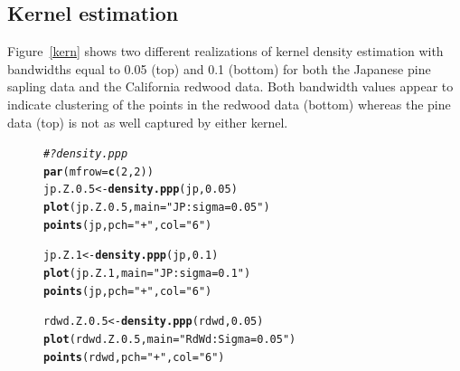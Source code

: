 \documentclass{article}\usepackage[]{graphicx}\usepackage[]{color}
\makeatletter
\newcommand{\hlnum}[1]{\textcolor[rgb]{0.686,0.059,0.569}{#1}}%
\newcommand{\hlstr}[1]{\textcolor[rgb]{0.192,0.494,0.8}{#1}}%
\newcommand{\hlcom}[1]{\textcolor[rgb]{0.678,0.584,0.686}{\textit{#1}}}%
\newcommand{\hlstd}[1]{\textcolor[rgb]{0.345,0.345,0.345}{#1}}%
\newcommand{\hlkwb}[1]{\textcolor[rgb]{0.69,0.353,0.396}{#1}}%
\newcommand{\hlkwc}[1]{\textcolor[rgb]{0.333,0.667,0.333}{#1}}%
\newcommand{\hlkwd}[1]{\textcolor[rgb]{0.737,0.353,0.396}{\textbf{#1}}}%
\newenvironment{kframe}{%
 \def\at@end@of@kframe{}%
 \ifinner\ifhmode%
  \def\at@end@of@kframe{\end{minipage}}%
  \begin{minipage}{\columnwidth}%
 \fi\fi%
 \def\FrameCommand##1{\hskip\@totalleftmargin \hskip-\fboxsep
 \colorbox{shadecolor}{##1}\hskip-\fboxsep
     \hskip-\linewidth \hskip-\@totalleftmargin \hskip\columnwidth}%
 \MakeFramed {\advance\hsize-\width
   \@totalleftmargin\z@ \linewidth\hsize
   \@setminipage}}%
 {\par\unskip\endMakeFramed%
 \at@end@of@kframe}
\newenvironment{knitrout}{}{} %
\makeatother
\begin{document}
\subsection{Kernel estimation}
Figure~\ref{kern} shows two different realizations of kernel density estimation with bandwidths equal to 0.05 (top) and 0.1 (bottom) for both the Japanese pine sapling data and the California redwood data.  Both bandwidth values appear to indicate clustering of the points in the redwood data (bottom) whereas the pine data (top) is not as well captured by either kernel.\\
\begin{figure}
\begin{knitrout}
\color{fgcolor}\begin{kframe}
\begin{alltt}
\hlcom{# ?density.ppp}
\hlkwd{par}\hlstd{(}\hlkwc{mfrow}\hlstd{=}\hlkwd{c}\hlstd{(}\hlnum{2}\hlstd{,}\hlnum{2}\hlstd{))}
\hlstd{jp.Z.0.5}\hlkwb{<-}\hlkwd{density.ppp}\hlstd{(jp,} \hlnum{0.05}\hlstd{)}
\hlkwd{plot}\hlstd{(jp.Z.0.5,} \hlkwc{main}\hlstd{=}\hlstr{"JP: sigma=0.05"}\hlstd{)}
\hlkwd{points}\hlstd{(jp,} \hlkwc{pch}\hlstd{=}\hlstr{"+"}\hlstd{,} \hlkwc{col}\hlstd{=}\hlstr{"6"}\hlstd{)}

\hlstd{jp.Z.1}\hlkwb{<-}\hlkwd{density.ppp}\hlstd{(jp,} \hlnum{0.1}\hlstd{)}
\hlkwd{plot}\hlstd{(jp.Z.1,} \hlkwc{main}\hlstd{=}\hlstr{"JP: sigma =0.1"}\hlstd{)}
\hlkwd{points}\hlstd{(jp,} \hlkwc{pch}\hlstd{=}\hlstr{"+"}\hlstd{,} \hlkwc{col}\hlstd{=}\hlstr{"6"}\hlstd{)}

\hlstd{rdwd.Z.0.5}\hlkwb{<-}\hlkwd{density.ppp}\hlstd{(rdwd,} \hlnum{0.05}\hlstd{)}
\hlkwd{plot}\hlstd{(rdwd.Z.0.5,} \hlkwc{main}\hlstd{=}\hlstr{"RdWd: Sigma=0.05"}\hlstd{)}
\hlkwd{points}\hlstd{(rdwd,} \hlkwc{pch}\hlstd{=}\hlstr{"+"}\hlstd{,} \hlkwc{col}\hlstd{=}\hlstr{"6"}\hlstd{)}


\end{alltt}
\end{kframe}
\end{knitrout}
\end{figure}
\end{document}
